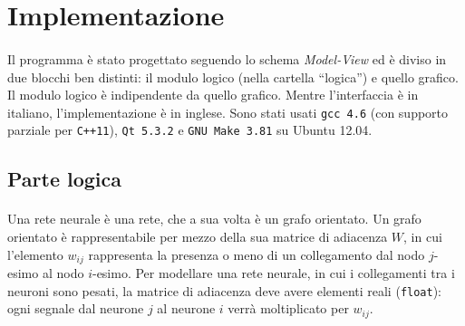 \documentclass{article}
\begin{document}

\section{Implementazione}

\paragraph{} Il programma è stato progettato seguendo lo schema \textit{Model-View} ed è diviso in due blocchi ben distinti: il modulo logico (nella cartella “logica”) e quello grafico. Il modulo logico è indipendente da quello grafico. Mentre l'interfaccia è in italiano, l'implementazione è in inglese. Sono stati usati \texttt{gcc 4.6} (con supporto parziale per \texttt{C++11}), \texttt{Qt 5.3.2} e \texttt{GNU Make 3.81} su Ubuntu 12.04.

\subsection{Parte logica}

\paragraph{} Una rete neurale è una rete, che a sua volta è un grafo orientato. Un grafo orientato è rappresentabile per mezzo della sua matrice di adiacenza $W$, in cui l'elemento $w_{ij}$ rappresenta la presenza o meno di un collegamento dal nodo $j$-esimo al nodo $i$-esimo. Per modellare una rete neurale, in cui i collegamenti tra i neuroni sono pesati, la matrice di adiacenza deve avere elementi reali (\texttt{float}): ogni segnale dal neurone $j$ al neurone $i$ verrà moltiplicato per $w_{ij}$.
\end{document}
